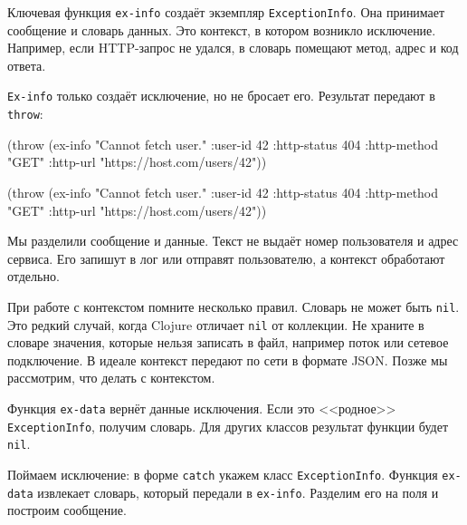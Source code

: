 Ключевая функция \verb|ex-info| создаёт экземпляр \verb|ExceptionInfo|. Она
принимает сообщение и словарь данных. Это контекст, в котором возникло
исключение. Например, если HTTP-запрос не удался, в словарь помещают метод,
адрес и код ответа.

\verb|Ex-info| только создаёт исключение, но не бросает его. Результат
передают в \verb|throw|:

\ifx\devicetype\mobile

\begin{english}
  \begin{clojure}
(throw (ex-info
        "Cannot fetch user."
        {:user-id 42
         :http-status 404
         :http-method "GET"
         :http-url
         "https://host.com/users/42"}))
  \end{clojure}
\end{english}

\else

\begin{english}
  \begin{clojure}
(throw (ex-info
        "Cannot fetch user."
        {:user-id 42
         :http-status 404
         :http-method "GET"
         :http-url "https://host.com/users/42"}))
  \end{clojure}
\end{english}

\fi

Мы разделили сообщение и данные. Текст не выдаёт номер пользователя и адрес
сервиса. Его запишут в лог или отправят пользователю, а контекст обработают
отдельно.

При работе с контекстом помните несколько правил. Словарь не может быть
\verb|nil|. Это редкий случай, когда Clojure отличает \verb|nil| от
коллекции. Не храните в словаре значения, которые нельзя записать в файл,
например поток или сетевое подключение. В идеале контекст передают по сети в
формате JSON. Позже мы рассмотрим, что делать с контекстом.

Функция \verb|ex-data| вернёт данные исключения. Если это <<родное>>
\verb|ExceptionInfo|, получим словарь. Для других классов результат функции
будет \verb|nil|.


Поймаем исключение: в форме \verb|catch| укажем класс
\verb|ExceptionInfo|. Функция \verb|ex-data| извлекает словарь, который передали
в \verb|ex-info|. Разделим его на поля и построим сообщение.

\ifx\devicetype\mobile

